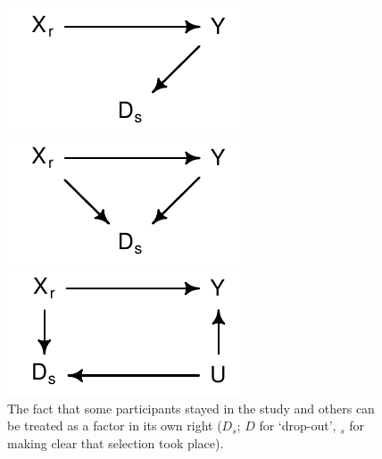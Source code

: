 \documentclass[a4paper]{tufte-book}\usepackage[]{graphicx}\usepackage[]{xcolor}
\begin{document}
\begin{figure}
    \centering

    \begin{minipage}{0.3\textwidth}
        \centering
        \includegraphics[width = \textwidth]{figure/dropout1}
    \end{minipage}
        \hfill
    \begin{minipage}{0.3\textwidth}
        \centering
        \includegraphics[width = \textwidth]{figure/dropout2}
    \end{minipage}
        \hfill
    \begin{minipage}{0.3\textwidth}
        \centering
        \includegraphics[width = \textwidth]{figure/dropout3}
    \end{minipage}

    \caption{The fact that some participants stayed in the study
    and others can be treated as a factor in its own right ($D_s$; $D$ for `drop-out', $_s$ for making clear
    that selection took place).}
    \label{fig:dropouts}
\end{figure}
\end{document}
